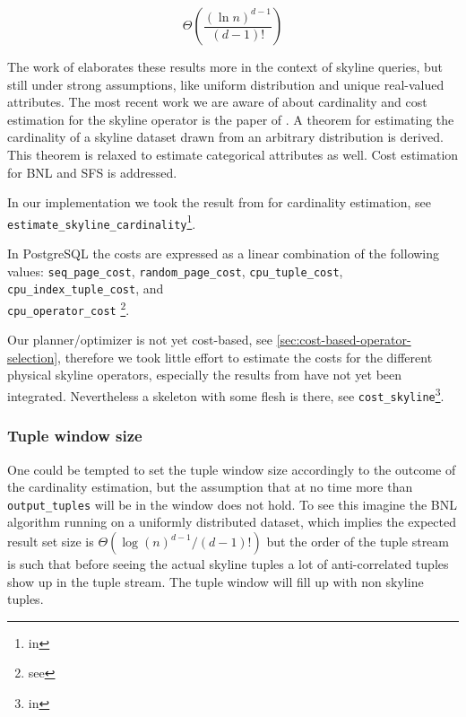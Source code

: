 \begin{equation}
\Theta\left(\frac{(\ln n)^{d-1}}{(d-1)!}\right)
\end{equation}

\noindent
The work of \citet{Godfrey2002} elaborates these results more in the
context of skyline queries, but still under strong assumptions, like
uniform distribution and unique real-valued attributes.
%
The most recent work we are aware of about cardinality and cost
estimation for the skyline operator is the paper of
\citet{Chaudhuri2006}. A theorem for estimating the cardinality of a skyline
dataset drawn from an arbitrary distribution is derived.  This theorem is
relaxed to estimate categorical attributes as well. Cost estimation
for BNL and SFS is addressed.

In our implementation we took the result from \citet{Buchta1989} for
cardinality estimation, see \texttt{estimate\_skyline\_cardinality}\footnote{in
}.

In PostgreSQL the costs are expressed as a linear combination of the following values:
\texttt{seq\_page\_cost}, \texttt{random\_page\_cost}, \texttt{cpu\_tuple\_cost},
\texttt{cpu\_index\_tuple\_cost}, and \\ \texttt{cpu\_operator\_cost}
\footnote{see }.

Our planner/optimizer is not yet cost-based, see
\autoref{sec:cost-based-operator-selection}, therefore we took little
effort to estimate the costs for the different physical skyline
operators, especially the results from \citet{Chaudhuri2006} have not
yet been integrated. Nevertheless a skeleton with some flesh is there,
see \texttt{cost\_skyline}\footnote{in
}.

\subsubsection{Tuple window size}
One could be tempted to set the tuple window size accordingly to the
outcome of the cardinality estimation, but the assumption that at no
time more than \texttt{output\_tuples} will be in the window does not
hold. To see this imagine the BNL algorithm running on a uniformly
distributed dataset, which implies the expected result set size is
$\Theta(\log(n)^{d-1} / (d-1)!)$ but the order of the tuple stream is
such that before seeing the actual skyline tuples a lot of
anti-correlated tuples show up in the tuple stream.  The tuple window
will fill up with non skyline tuples.


